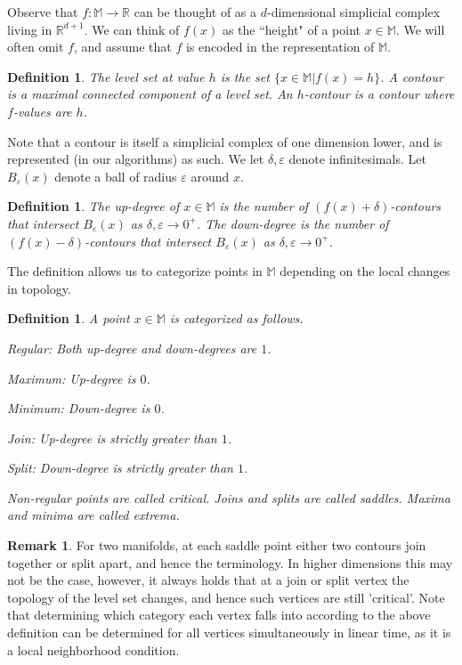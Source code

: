 \documentclass[11pt]{article}
\newtheorem{definition}[theorem]{Definition}
\theoremstyle{definition}
\newtheorem{remark}{Remark}
\newcommand{\MM}{\mathbb{M}}
\newcommand{\RR}{\mathbb{R}}
\newcommand{\eps}{\varepsilon}
\begin{document}
Observe that $f:\MM \rightarrow \RR$ can be thought of as a $d$-dimensional simplicial complex living in $\RR^{d+1}$.
We can think of $f(x)$ as the ``height" of a point $x \in \MM$.
We will often omit $f$, and assume that $f$ is encoded in the representation of $\MM$.

\begin{definition} \label{def:level} The level set at value $h$ is the set $\{x \in \MM| f(x) = h\}$.
A contour is a maximal connected component of a level set. An $h$-contour is a contour where $f$-values are $h$.
\end{definition}

Note that a contour is itself a simplicial complex of one dimension lower, and is represented (in our algorithms) as such.
We let $\delta, \eps$ denote infinitesimals. Let $B_\eps(x)$ denote a ball of radius $\eps$ around $x$.

\begin{definition} \label{def:deg} The up-degree of $x \in \MM$ is the number of $(f(x) + \delta)$-contours that intersect $B_\eps(x)$
as $\delta, \eps \rightarrow 0^+$. The down-degree is the number of $(f(x) - \delta)$-contours that intersect $B_\eps(x)$
as $\delta, \eps \rightarrow 0^+$.
\end{definition}

The definition allows us to categorize points in $\MM$ depending on the local changes in topology.

\begin{definition} \label{def:points} A point $x \in \MM$ is categorized as follows.
\begin{asparaitem}
	\item Regular: Both up-degree and down-degrees are $1$.
	\item Maximum: Up-degree is $0$.
	\item Minimum: Down-degree is $0$.
	\item Join: Up-degree is strictly greater than $1$.
	\item Split: Down-degree is strictly greater than $1$.
\end{asparaitem}
Non-regular points are called \emph{critical}. Joins and splits are called \emph{saddles}.
Maxima and minima are called \emph{extrema}.
\end{definition}

\begin{remark}
 For two manifolds, at each saddle point either two contours join together or split apart, and hence the terminology.  In higher dimensions this may not be the case, however, it always holds that at a join or split vertex the topology of the level set changes, and hence such vertices are still 'critical'.  Note that determining which category each vertex falls into according to the above definition can be determined for all vertices simultaneously in linear time, as it is a local neighborhood condition.
\end{remark}
\end{document}

